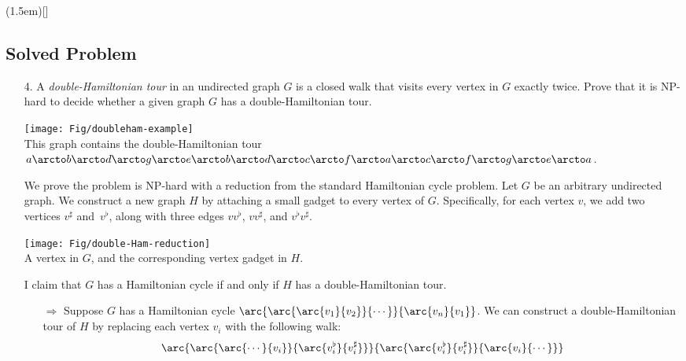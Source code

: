 \documentclass[11pt]{article}
\begin{document}

%
%
\def\EONSmark{\decosix\global\needqedfalse}
\def\EONS{\ifneedqed\markatright{\EONSmark}\else\null\fi}
(\color{OliveGreen}\normalsize\rmfamily\parindent1.5em)[\EONS]

\vspace{1in}
\subsection*{Solved Problem}

\begin{enumerate}\parindent1.5em
\item[4.]
A \emph{double-Hamiltonian tour} in an undirected graph $G$ is a closed walk that visits every vertex in $G$ exactly twice.  Prove that it is NP-hard to decide whether a given graph $G$ has a double-Hamiltonian tour.

\begin{inline}
\texttt{[image: Fig/doubleham-example]}\\
This graph contains the double-Hamiltonian tour $a\arcto b\arcto d\arcto g\arcto e\arcto b\arcto d\arcto c\arcto f\arcto a\arcto c\arcto f\arcto g\arcto e\arcto a$.
\end{inline}


\begin{solution}
We prove the problem is {NP}-hard with a reduction from the standard Hamiltonian cycle problem.  Let $G$ be an arbitrary undirected graph.  We construct a new graph $H$ by attaching a small gadget to every vertex of $G$.  Specifically, for each vertex $v$, we add two vertices $v^\sharp$ and~$v^\flat$, along with three edges $vv^\flat$, $vv^\sharp$, and $v^\flat v^\sharp$.

\begin{inline}
\texttt{[image: Fig/double-Ham-reduction]}\\
A vertex in $G$, and the corresponding vertex gadget in $H$.
\end{inline}

I claim that $G$ has a Hamiltonian cycle if and only if $H$ has a double-Hamiltonian tour.

\begin{itemize}
\item[$\Longrightarrow$]
Suppose $G$ has a Hamiltonian cycle $\arc{\arc{\arc{v_1}{v_2}}{\cdots}}{\arc{v_n}{v_1}}$.  We can construct a double-Hamiltonian tour of $H$ by replacing each vertex $v_i$ with the following walk:
\[
	\arc{\arc{\arc{\cdots}{v_i}}
			{\arc{v_i^\flat}{v_i^\sharp}}}
		{\arc{\arc{v_i^\flat}{v_i^\sharp}}
			{\arc{v_i}{\cdots}}}
\]


\end{itemize}
\end{solution}
\end{enumerate}
\end{document}
